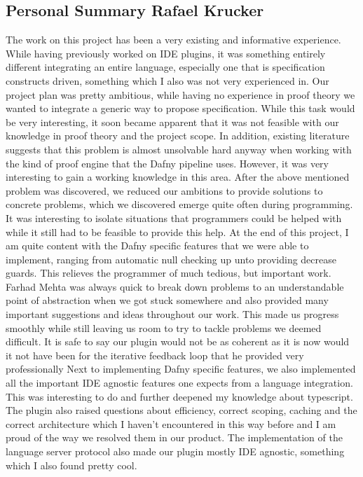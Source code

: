 \subsection{Personal Summary Rafael Krucker}
The work on this project has been a very existing and informative experience. While having previously worked on IDE plugins, it was something entirely different integrating an entire language, especially one that is specification constructs driven, something which I also was not very experienced in. \newline
Our project plan was pretty ambitious, while having no experience in proof theory we wanted to integrate a generic way to propose specification. While this task would be very interesting, it soon became apparent that it was not feasible with our knowledge in proof theory and the project scope. In addition, existing literature suggests that this problem is almost unsolvable hard anyway when working with the kind of proof engine that the Dafny pipeline uses. However, it was very interesting to gain a working knowledge in this area. \newline
After the above mentioned problem was discovered, we reduced our ambitions to provide solutions to concrete problems, which we discovered emerge quite often during programming. It was interesting to isolate situations that programmers could be helped with while it still had to be feasible to provide this help. At the end of this project, I am quite content with the Dafny specific features that we were able to implement, ranging from automatic null checking up unto providing decrease guards. This relieves the programmer of much tedious, but important work. \newline
Farhad Mehta was always quick to break down problems to an understandable point of abstraction when we got stuck somewhere and also provided many important suggestions and ideas throughout our work. This made us progress smoothly while still leaving us room to try to tackle problems we deemed difficult. It is safe to say our plugin would not be as coherent as it is now would it not have been for the iterative feedback loop that he provided very professionally \newline
Next to implementing Dafny specific features, we also implemented all the important IDE agnostic features one expects from a language integration. This was interesting to do and further deepened my knowledge about typescript. The plugin also raised questions about efficiency, correct scoping, caching and the correct architecture which I haven't encountered in this way before and I am proud of the way we resolved them in our product. The implementation of the language server protocol also made our plugin mostly IDE agnostic, something which I also found pretty cool. \newline 
